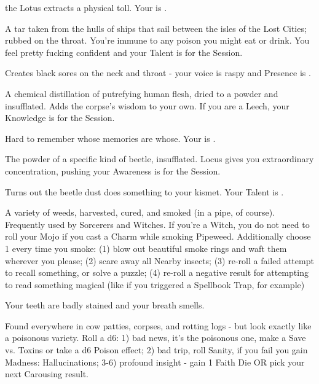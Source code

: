 {\begin{multicols}{2}
    the Lotus extracts a physical toll.  Your \MAX \VIG is \DCDOWN.


  A tar taken from the hulls of ships that sail between the isles of the Lost Cities; rubbed on the throat. You're immune to any poison you might eat or drink. You feel pretty fucking confident and your \MAX Talent is \DCUP for the Session.

     Creates black sores on the neck and throat - your voice is raspy and \MAX Presence is \DCDOWN.

  \newpage


  A chemical distillation of putrefying human flesh, dried to a powder and insufflated. Adds the corpse's wisdom to your own. If you are a Leech, your Knowledge \STATIC is \DCUP for the Session.

     Hard to remember whose memories are whose.  Your \MAX \FOC is \DCDOWN.


  The powder of a specific kind of beetle, insufflated.  Locus gives you extraordinary concentration, pushing your \MAX Awareness is \DCUP for the Session.

    Turns out the beetle dust does something to your kismet.   Your \MAX Talent is \DCDOWN.



  A variety of weeds, harvested, cured, and smoked (in a pipe, of course). Frequently used by Sorcerers and Witches. If you're a Witch, you do not need to roll your Mojo if you cast a Charm while smoking Pipeweed.  Additionally choose 1 every time you smoke: (1) blow out beautiful smoke rings and waft them wherever you please; (2) scare away all Nearby insects; (3) re-roll a failed attempt to recall something, or solve a puzzle; (4) re-roll a negative result for attempting to read something magical (like if you triggered a Spellbook Trap, for example)

     Your teeth are badly stained and your breath smells.


  Found everywhere in cow patties, corpses, and rotting logs - but look exactly like a poisonous variety.  Roll a d6: 1) bad news, it's the poisonous one, make a Save vs. Toxins or take a d6 Poison effect; 2) bad trip, roll Sanity, if you fail you gain Madness: Hallucinations; 3-6) profound insight - gain 1 Faith Die OR pick your next Carousing result.


\end{multicols}}
